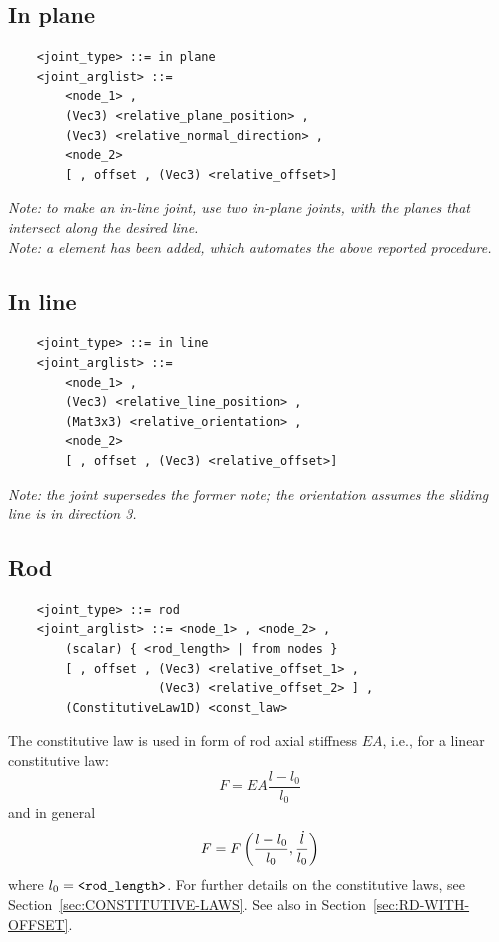 \subsection{In plane}
\begin{verbatim}
    <joint_type> ::= in plane
    <joint_arglist> ::= 
        <node_1> , 
        (Vec3) <relative_plane_position> ,
        (Vec3) <relative_normal_direction> ,
        <node_2>
        [ , offset , (Vec3) <relative_offset>]
\end{verbatim}
{\em
    Note: to make an in-line joint, use two in-plane joints, with the
    planes that intersect along the desired line. \\
    Note: a  element has been added, which automates the above
    reported procedure.
}

\subsection{In line}
\begin{verbatim}
    <joint_type> ::= in line
    <joint_arglist> ::= 
        <node_1> , 
        (Vec3) <relative_line_position> ,
        (Mat3x3) <relative_orientation> ,
        <node_2>
        [ , offset , (Vec3) <relative_offset>]
\end{verbatim}
{\em 
    Note: the  joint supersedes the former note; the orientation
    assumes the sliding line is in direction 3.
}

\subsection{Rod}
\begin{verbatim}
    <joint_type> ::= rod 
    <joint_arglist> ::= <node_1> , <node_2> , 
        (scalar) { <rod_length> | from nodes }
        [ , offset , (Vec3) <relative_offset_1> , 
                     (Vec3) <relative_offset_2> ] ,
        (ConstitutiveLaw1D) <const_law>
\end{verbatim}
The constitutive law  is used in form 
of rod axial stiffness $EA$, i.e., for a linear constitutive law:
\begin{displaymath}
	F = EA \frac{l - l_0}{l_0}
\end{displaymath}
and in general
\begin{displaymath}
	F = F\left( \frac{l - l_0}{l_0}, \frac{\dot{l}}{l_0} \right)
\end{displaymath}
where $l_0=\texttt{<rod\_length>}$.
For further details on the constitutive laws, 
see Section~\ref{sec:CONSTITUTIVE-LAWS}.
See also  in Section~\ref{sec:RD-WITH-OFFSET}.

